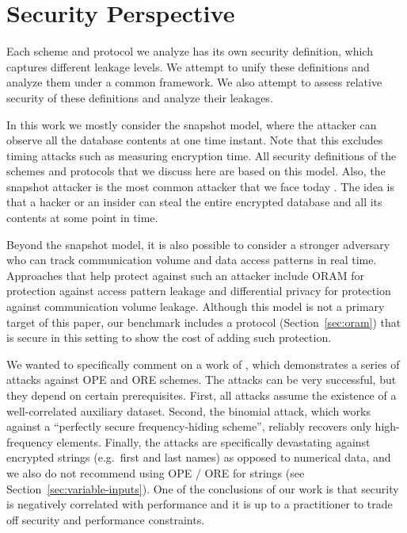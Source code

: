 \section{Security Perspective}\label{sec:security}

	Each scheme and protocol we analyze has its own security definition, which captures different leakage levels.
	We attempt to unify these definitions and analyze them under a common framework.
	We also attempt to assess relative security of these definitions and analyze their leakages.

	In this work we mostly consider the snapshot model, where the attacker can observe all the database contents at one time instant.
	Note that this excludes timing attacks such as measuring encryption time.
	All security definitions of the schemes and protocols that we discuss here are based on this model.
	Also, the snapshot attacker is the most common attacker that we face today \cite{secure-queries-overview}.
	The idea is that a hacker or an insider can steal the entire encrypted database and all its contents at some point in time.

	Beyond the snapshot model, it is also possible to consider a stronger adversary who can track communication volume and data access patterns in real time.
	Approaches that help protect against such an attacker include ORAM for protection against access pattern leakage and differential privacy for protection against communication volume leakage.
	Although this model is not a primary target of this paper, our benchmark includes a protocol (Section~\ref{sec:oram}) that is secure in this setting to show the cost of adding such protection.

	We wanted to specifically comment on a work of \textcite{leakage-abuse-grubs-2017}, which demonstrates a series of attacks against OPE and ORE schemes.
	The attacks can be very successful, but they depend on certain prerequisites.
	First, all attacks assume the existence of a well-correlated auxiliary dataset.
	Second, the binomial attack, which works against a ``perfectly secure frequency-hiding scheme'', reliably recovers only high-frequency elements.
	Finally, the attacks are specifically devastating against encrypted strings (e.g.\ first and last names) as opposed to numerical data, and we also do not recommend using OPE / ORE for strings (see Section~\ref{sec:variable-inputs}).
	One of the conclusions of our work is that security is negatively correlated with performance and it is up to a practitioner to trade off security and performance constraints.


